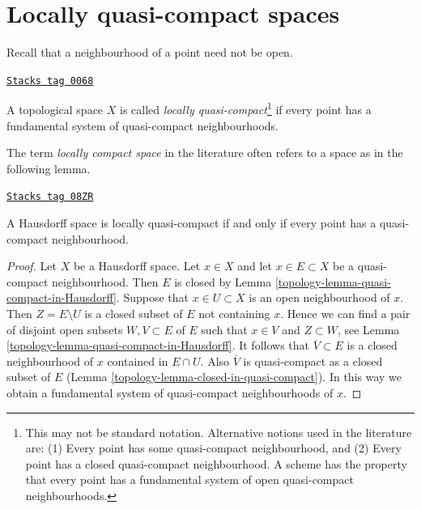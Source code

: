 \section{Locally quasi-compact spaces}
\label{topology-section-locally-quasi-compact}
Recall that a neighbourhood of a point need not be open.

\begin{definition}
\label{topology-definition-locally-quasi-compact}
\href{https://stacks.math.columbia.edu/tag/0068}{\texttt{Stacks tag 0068}}

A topological space $X$ is called
{\it locally quasi-compact}\footnote{This may not be standard notation.
Alternative notions used in the literature are: (1) Every point has some
quasi-compact neighbourhood, and (2) Every point has a closed quasi-compact
neighbourhood. A scheme has the property that every point has a fundamental
system of open quasi-compact neighbourhoods.} if every
point has a fundamental system of quasi-compact neighbourhoods.
\end{definition}

The term {\it locally compact space} in the literature often refers
to a space as in the following lemma.

\begin{lemma}
\label{topology-lemma-locally-quasi-compact-Hausdorff}
\href{https://stacks.math.columbia.edu/tag/08ZR}{\texttt{Stacks tag 08ZR}}

A Hausdorff space is locally quasi-compact if and only if every point
has a quasi-compact neighbourhood.
\end{lemma}

\begin{proof}

Let $X$ be a Hausdorff space. Let $x \in X$ and let $x \in E \subset X$
be a quasi-compact neighbourhood. Then $E$ is closed by
Lemma \ref{topology-lemma-quasi-compact-in-Hausdorff}.
Suppose that $x \in U \subset X$ is an open neighbourhood of $x$.
Then $Z = E \setminus U$ is a closed subset of $E$ not containing $x$.
Hence we can find a pair of disjoint open subsets $W, V \subset E$
of $E$ such that $x \in V$ and $Z \subset W$, see
Lemma \ref{topology-lemma-quasi-compact-in-Hausdorff}.
It follows that $\overline{V} \subset E$ is a closed neighbourhood
of $x$ contained in $E \cap U$. Also $\overline{V}$ is quasi-compact
as a closed subset of $E$ (Lemma \ref{topology-lemma-closed-in-quasi-compact}).
In this way we obtain a fundamental system of quasi-compact neighbourhoods
of $x$.
\end{proof}

